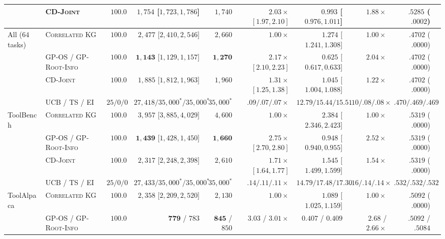 \documentclass{article}
\theoremstyle{plain}
\theoremstyle{definition}
\begin{document}
\begin{table}[!htbp]
{\begin{tabular}{@{}llrrrrrrrr@{}}
 & \textsc{CD-Joint} & $\mathbf{100.0}$ & $1{,}754$ [$1{,}723,1{,}786$] & $1{,}740$ & $2.03\times$ $[1.97,2.10]$ & $0.993$ [$0.976,1.011$] & $1.88\times$ & $.5285$ ($.0002$) \\
\midrule
\multirow{4}{*}{All ($64$ tasks)}
 & \textsc{Correlated KG} & $100.0$ & $2{,}477$ [$2{,}410,2{,}546$] & $2{,}660$ & $1.00\times$ & $1.274$ [$1.241,1.308$] & $1.00\times$ & $.4702$ ($.0000$) \\
 & \textsc{GP-OS} / \textsc{GP-Root-Info} & $100.0$ & $\mathbf{1{,}143}$ [$1{,}129,1{,}157$] & $\mathbf{1{,}270}$ & $\mathbf{2.17\times}$ $[2.10,2.23]$ & $\mathbf{0.625}$ [$0.617,0.633$] & $\mathbf{2.04\times}$ & $.4702$ ($.0000$) \\
 & \textsc{CD-Joint} & $100.0$ & $1{,}885$ [$1{,}812,1{,}963$] & $1{,}960$ & $1.31\times$ $[1.25,1.38]$ & $1.045$ [$1.004,1.088$] & $1.22\times$ & $.4702$ ($.0000$) \\
 & \textsc{UCB} / \textsc{TS} / \textsc{EI} & $25/0/0$ & $27{,}418 / 35{,}000^* / 35{,}000^*$ & $35{,}000^*$ & $.09/.07/.07\times$ & $12.79 / 15.44 / 15.51$ & $.10/.08/.08\times$ & $.470/.469/.469$ \\
\midrule
\multirow{4}{*}{ToolBench}
 & \textsc{Correlated KG} & $100.0$ & $3{,}957$ [$3{,}885,4{,}029$] & $4{,}600$ & $1.00\times$ & $2.384$ [$2.346,2.423$] & $1.00\times$ & $.5319$ ($.0000$) \\
 & \textsc{GP-OS} / \textsc{GP-Root-Info} & $100.0$ & $\mathbf{1{,}439}$ [$1{,}428,1{,}450$] & $\mathbf{1{,}660}$ & $\mathbf{2.75\times}$ $[2.70,2.80]$ & $\mathbf{0.948}$ [$0.940,0.955$] & $\mathbf{2.52\times}$ & $.5319$ ($.0000$) \\
 & \textsc{CD-Joint} & $100.0$ & $2{,}317$ [$2{,}248,2{,}398$] & $2{,}610$ & $1.71\times$ $[1.64,1.77]$ & $1.545$ [$1.499,1.599$] & $1.54\times$ & $.5319$ ($.0000$) \\
 & \textsc{UCB} / \textsc{TS} / \textsc{EI} & $25/0/0$ & $27{,}433 / 35{,}000^* / 35{,}000^*$ & $35{,}000^*$ & $.14/.11/.11\times$ & $14.79 / 17.48 / 17.30$ & $.16/.14/.14\times$ & $.532/.532/.532$ \\
\midrule
\multirow{4}{*}{ToolAlpaca}
 & \textsc{Correlated KG} & $100.0$ & $2{,}358$ [$2{,}209,2{,}520$] & $2{,}130$ & $1.00\times$ & $1.089$ [$1.025,1.159$] & $1.00\times$ & $.5092$ ($.0000$) \\
 & \textsc{GP-OS} / \textsc{GP-Root-Info} & $100.0$ & $\mathbf{779}$ / $783$ & $\mathbf{845}$ / $850$ & $\mathbf{3.03}$ / $3.01\times$ & $\mathbf{0.407}$ / $0.409$ & $\mathbf{2.68}$ / $2.66\times$ & $.5092$ / $.5084$ \\

\end{tabular}}
\end{table}
\end{document}
